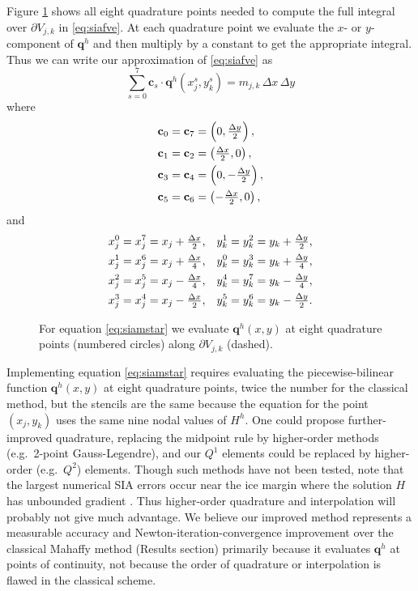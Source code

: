 \documentclass[twocolumn,letterpaper]{igs}
\newcommand\bc{\mathbf{c}}
\newcommand\bq{\mathbf{q}}
\begin{document}
Figure \ref{fig:improvequadrature} shows all eight quadrature points needed to compute the full integral over $\partial V_{j,k}$ in \eqref{eq:siafve}.  At each quadrature point we evaluate the $x$- or $y$-component of $\bq^h$ and then multiply by a constant to get the appropriate integral.  Thus we can write our approximation of \eqref{eq:siafve} as
\begin{equation}
\sum_{s=0}^7 \bc_s \cdot \bq^h(x_j^s,y_k^s) = m_{j,k}\,\Delta x\,\Delta y  \label{eq:siamstar}
\end{equation}
where
\begin{align}
\bc_0 &= \bc_7 = \left(0, \tfrac{\Delta y}{2}\right),  \label{eq:cs} \\
\bc_1 &= \bc_2 = \left(\tfrac{\Delta x}{2},0\right),  \notag \\
\bc_3 &= \bc_4 = \left(0, -\tfrac{\Delta y}{2}\right),  \notag \\
\bc_5 &= \bc_6 = \left(-\tfrac{\Delta x}{2},0\right),  \notag
\end{align}
and
\begin{align}
x_j^0 &= x_j^7 = x_j + \tfrac{\Delta x}{2}, & y_k^1 &= y_k^2 = y_k + \tfrac{\Delta y}{2}, \label{eq:xjsyks} \\
x_j^1 &= x_j^6 = x_j + \tfrac{\Delta x}{4}, & y_k^0 &= y_k^3 = y_k + \tfrac{\Delta y}{4}, \notag \\
x_j^2 &= x_j^5 = x_j - \tfrac{\Delta x}{4}, & y_k^4 &= y_k^7 = y_k - \tfrac{\Delta y}{4}, \notag \\
x_j^3 &= x_j^4 = x_j - \tfrac{\Delta x}{2}, & y_k^5 &= y_k^6 = y_k - \tfrac{\Delta y}{2}. \notag
\end{align}

\begin{figure}[ht]
\begin{center}

\end{center}
\caption{For equation \eqref{eq:siamstar} we evaluate $\bq^h(x,y)$ at eight quadrature points (numbered circles) along $\partial V_{j,k}$ (dashed).}
\label{fig:improvequadrature}
\end{figure}

Implementing equation \eqref{eq:siamstar} requires evaluating the piecewise-bilinear function $\bq^h(x,y)$ at eight quadrature points, twice the number for the classical method, but the stencils are the same because the equation for the point $(x_j,y_k)$ uses the same nine nodal values of $H^h$.  One could propose further-improved quadrature, replacing the midpoint rule by higher-order methods (e.g.~2-point Gauss-Legendre), and our $Q^1$ elements could be replaced by higher-order (e.g.~$Q^2$) elements.  Though such methods have not been tested, note that the largest numerical SIA errors occur near the ice margin where the solution $H$ has unbounded gradient \citep{Bueleretal2005}.  Thus higher-order quadrature and interpolation will probably not give much advantage.  We believe our improved method represents a measurable accuracy and Newton-iteration-convergence improvement over the classical Mahaffy method (Results section) primarily because it evaluates $\bq^h$ at points of continuity, not because the order of quadrature or interpolation is flawed in the classical scheme.
\end{document}

